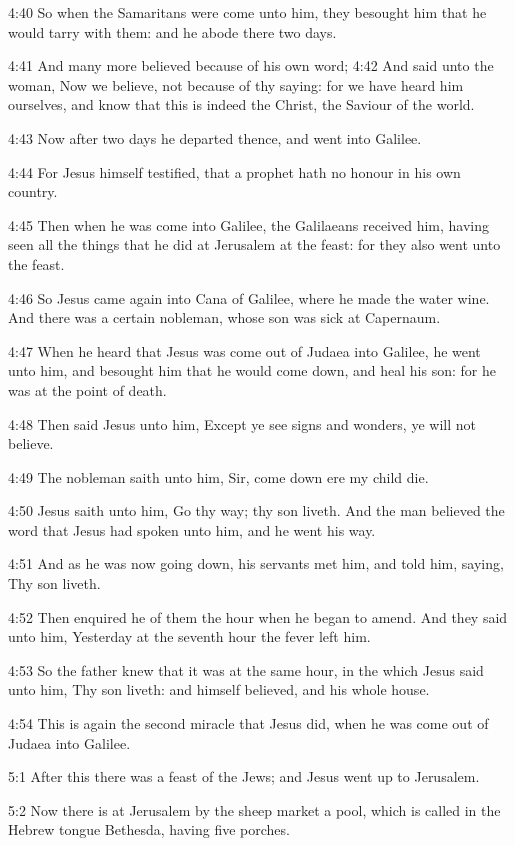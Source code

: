 4:40 So when the Samaritans were come unto him, they besought him that he would tarry with them: and he abode there two days.

4:41 And many more believed because of his own word; 4:42 And said unto the woman, Now we believe, not because of thy saying: for we have heard him ourselves, and know that this is indeed the Christ, the Saviour of the world.

4:43 Now after two days he departed thence, and went into Galilee.

4:44 For Jesus himself testified, that a prophet hath no honour in his own country.

4:45 Then when he was come into Galilee, the Galilaeans received him, having seen all the things that he did at Jerusalem at the feast: for they also went unto the feast.

4:46 So Jesus came again into Cana of Galilee, where he made the water wine. And there was a certain nobleman, whose son was sick at Capernaum.

4:47 When he heard that Jesus was come out of Judaea into Galilee, he went unto him, and besought him that he would come down, and heal his son: for he was at the point of death.

4:48 Then said Jesus unto him, Except ye see signs and wonders, ye will not believe.

4:49 The nobleman saith unto him, Sir, come down ere my child die.

4:50 Jesus saith unto him, Go thy way; thy son liveth. And the man believed the word that Jesus had spoken unto him, and he went his way.

4:51 And as he was now going down, his servants met him, and told him, saying, Thy son liveth.

4:52 Then enquired he of them the hour when he began to amend. And they said unto him, Yesterday at the seventh hour the fever left him.

4:53 So the father knew that it was at the same hour, in the which Jesus said unto him, Thy son liveth: and himself believed, and his whole house.

4:54 This is again the second miracle that Jesus did, when he was come out of Judaea into Galilee.

5:1 After this there was a feast of the Jews; and Jesus went up to Jerusalem.

5:2 Now there is at Jerusalem by the sheep market a pool, which is called in the Hebrew tongue Bethesda, having five porches.

